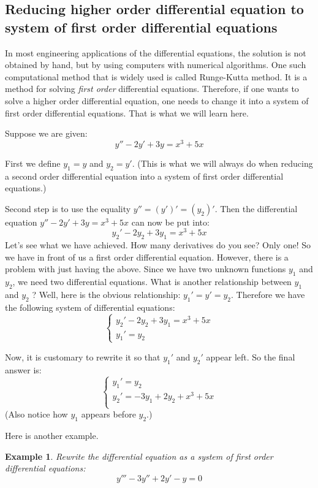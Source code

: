 \documentclass[12pt]{report}
\newtheorem{ex}{Example}[section]
\begin{document}
\subsection*{Reducing higher order differential equation to system of first order differential equations}

In most engineering applications of the differential equations, the solution is not obtained by hand, but by using computers with numerical algorithms. One such computational method that is widely used is called Runge-Kutta method. It is a method for solving \textit{first order} differential equations. Therefore, if one wants to solve a higher order differential equation, one needs to change it into a system of first order differential equations. That is what we will learn here.

Suppose we are given:
$$y''-2y'+3y=x^3+5x$$

First we define $y_1 = y$ and $y_2 = y'$. (This is what we will always do when reducing a second order differential equation into a system of first order differential equations.)

Second step is to use the equality $y''=(y')'=(y_2)'$. Then the differential equation $y''-2y'+3y=x^3+5x$ can now be put into:
$$y_2'-2y_2+3y_1 = x^3 +5x$$
Let's see what we have achieved. How many derivatives do you see? Only one! So we have in front of us a first order differential equation. However, there is a problem with just having the above. Since we have two unknown functions $y_1$ and $y_2$, we need two differential equations. What is another relationship between  $y_1$ and $y_2$ ? Well, here is the obvious relationship: $y_1' = y' = y_2$. Therefore we have the following system of differential equations:
$$\begin{cases} y_2'-2y_2+3y_1 = x^3 +5x \\ y_1' = y_2 \end{cases}$$

Now, it is customary to rewrite it so that $y_1'$ and $y_2'$ appear left. So the final answer is:
$$\begin{cases} y_1' = y_2 \\ y_2'=-3y_1 +2y_2+ x^3 +5x \\  \end{cases}$$
(Also notice how $y_1$ appears before $y_2$.)

Here is another example.

\begin{ex} Rewrite the differential equation as a system of first order differential equations:
$$y'''-3y''+2y'-y=0$$
\end{ex}
\end{document}

